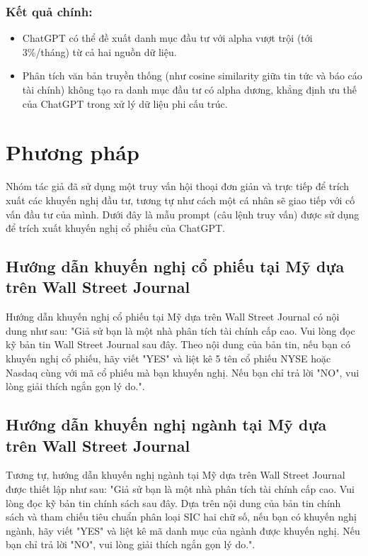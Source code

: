 \documentclass[a4paper,12pt]{article}
\begin{document}
\noindent
\subsubsection{{Kết quả chính:}}
\begin{itemize}
    \item ChatGPT có thể đề xuất danh mục đầu tư với alpha vượt trội (tới 3\%/tháng) từ cả hai nguồn dữ liệu.
    \item Phân tích văn bản truyền thống (như cosine similarity giữa tin tức và báo cáo tài chính) không tạo ra danh mục đầu tư có alpha dương, khẳng định ưu thế của ChatGPT trong xử lý dữ liệu phi cấu trúc.
\end{itemize}
\section{Phương pháp}
Nhóm tác giả đã sử dụng một truy vấn hội thoại đơn giản và trực tiếp để trích xuất các khuyến nghị đầu tư, tương tự như cách một cá nhân sẽ giao tiếp với cố vấn đầu tư của mình. Dưới đây là mẫu prompt (câu lệnh truy vấn) được sử dụng để trích xuất khuyến nghị cổ phiếu của ChatGPT.


\subsection{Hướng dẫn khuyến nghị cổ phiếu tại Mỹ dựa trên Wall Street Journal}
Hướng dẫn khuyến nghị cổ phiếu tại Mỹ dựa trên Wall Street Journal có nội dung như sau: "Giả sử bạn là một nhà phân tích tài chính cấp cao. Vui lòng đọc kỹ bản tin Wall Street Journal sau đây. Theo nội dung của bản tin, nếu bạn có khuyến nghị cổ phiếu, hãy viết "YES" và liệt kê 5 tên cổ phiếu NYSE hoặc Nasdaq cùng với mã cổ phiếu mà bạn khuyến nghị. Nếu bạn chỉ trả lời "NO", vui lòng giải thích ngắn gọn lý do.".

\subsection{Hướng dẫn khuyến nghị ngành tại Mỹ dựa trên Wall Street Journal}
Tương tự, hướng dẫn khuyến nghị ngành tại Mỹ dựa trên Wall Street Journal được thiết lập như sau: "Giả sử bạn là một nhà phân tích tài chính cấp cao. Vui lòng đọc kỹ bản tin chính sách sau đây. Dựa trên nội dung của bản tin chính sách và tham chiếu tiêu chuẩn phân loại SIC hai chữ số, nếu bạn có khuyến nghị ngành, hãy viết "YES" và liệt kê mã danh mục của ngành được khuyến nghị. Nếu bạn chỉ trả lời "NO", vui lòng giải thích ngắn gọn lý do.".
\end{document}
